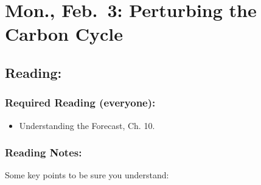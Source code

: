 \documentclass[
]{article}
\providecommand{\tightlist}{%
  \setlength{\itemsep}{0pt}\setlength{\parskip}{0pt}}
\begin{document}
\hypertarget{mon.-feb.-3-perturbing-the-carbon-cycle}{%
\section{Mon., Feb.~3: Perturbing the Carbon
Cycle}\label{mon.-feb.-3-perturbing-the-carbon-cycle}}

\hypertarget{reading-11}{%
\subsection{Reading:}\label{reading-11}}

\hypertarget{required-reading-everyone-9}{%
\subsubsection{Required Reading
(everyone):}\label{required-reading-everyone-9}}

\begin{itemize}
\tightlist
\item
  Understanding the Forecast, Ch. 10.
\end{itemize}

\hypertarget{reading-notes-9}{%
\subsubsection{Reading Notes:}\label{reading-notes-9}}

Some key points to be sure you understand:
\end{document}
